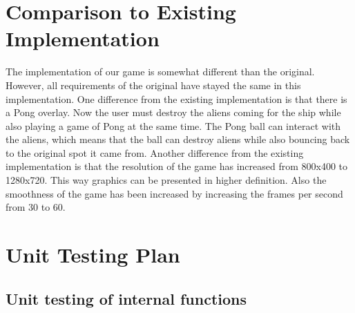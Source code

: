 \documentclass[12pt, titlepage]{article}
\begin{document}
\section{Comparison to Existing Implementation}	
The implementation of our game is somewhat different than the original. However, all requirements of the original have stayed the same in this implementation. 
One difference from the existing implementation is that there is a Pong overlay. Now the user must destroy the aliens coming for the ship while also playing a 
game of Pong at the same time. The Pong ball can interact with the aliens, which means that the ball can destroy aliens while also bouncing back to the original 
spot it came from. Another difference from the existing implementation is that the resolution of the game has increased from 800x400 to 1280x720. 
This way graphics can be presented in higher definition. Also the smoothness of the game has been increased by increasing the frames per second from 30 to 60.
				
\section{Unit Testing Plan}
		
\subsection{Unit testing of internal functions}
\end{document}
